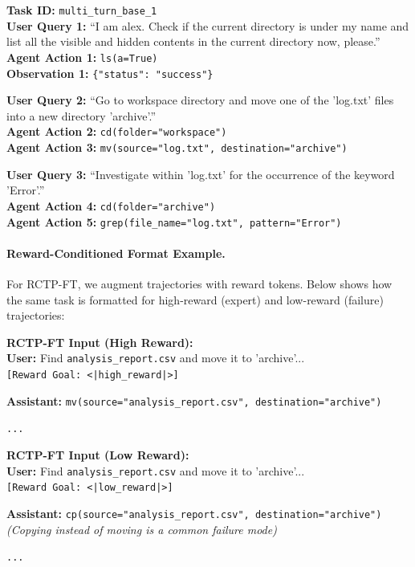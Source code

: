 \documentclass{article}
\theoremstyle{plain}
\theoremstyle{definition}
\theoremstyle{remark}
\begin{document}
\begin{defaultbox}
\textbf{Task ID:} \texttt{multi\_turn\_base\_1} \\
\textbf{User Query 1:} ``I am alex. Check if the current directory is under my name and list all the visible and hidden contents in the current directory now, please.'' \\
\textbf{Agent Action 1:} \texttt{ls(a=True)} \\
\textbf{Observation 1:} \texttt{\{"status": "success"\}}

\textbf{User Query 2:} ``Go to workspace directory and move one of the 'log.txt' files into a new directory 'archive'.'' \\
\textbf{Agent Action 2:} \texttt{cd(folder="workspace")} \\
\textbf{Agent Action 3:} \texttt{mv(source="log.txt", destination="archive")}

\textbf{User Query 3:} ``Investigate within 'log.txt' for the occurrence of the keyword 'Error'.'' \\
\textbf{Agent Action 4:} \texttt{cd(folder="archive")} \\
\textbf{Agent Action 5:} \texttt{grep(file\_name="log.txt", pattern="Error")}
\end{defaultbox}

\paragraph{Reward-Conditioned Format Example.}
For RCTP-FT, we augment trajectories with reward tokens. Below shows how the same task is formatted for high-reward (expert) and low-reward (failure) trajectories:

\begin{orangebox}
\textbf{RCTP-FT Input (High Reward):} \\
\textbf{User:} Find \texttt{analysis\_report.csv} and move it to 'archive'... \\
\texttt{[Reward Goal: <|high\_reward|>]}

\textbf{Assistant:} \texttt{mv(source="analysis\_report.csv", destination="archive")}

\texttt{...}
\end{orangebox}

\begin{bluebox}
\textbf{RCTP-FT Input (Low Reward):} \\
\textbf{User:} Find \texttt{analysis\_report.csv} and move it to 'archive'... \\
\texttt{[Reward Goal: <|low\_reward|>]}

\textbf{Assistant:} \texttt{cp(source="analysis\_report.csv", destination="archive")} \\
\textit{(Copying instead of moving is a common failure mode)}

\texttt{...}
\end{bluebox}
\end{document}
